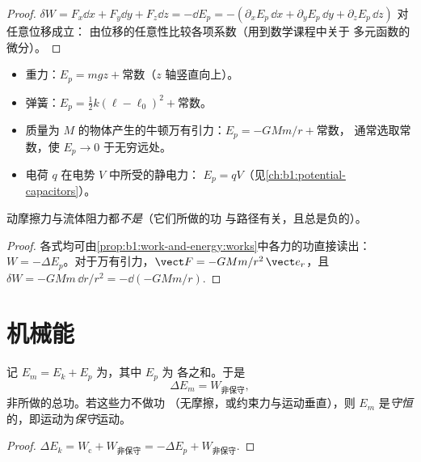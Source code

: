 \begin{proof}
$\delta W = F_x\dd x + F_y\dd y + F_z\dd z = -\dd E_p = -(\partial_xE_p\,\dd x
+ \partial_yE_p\,\dd y + \partial_zE_p\,\dd z)$ 对任意位移成立：
由位移的任意性比较各项系数（用到数学课程中关于
多元函数的微分）。
\end{proof}

\begin{proposition}[常见势能]\label{prop:b1:work-and-energy:eps}
\begin{itemize}
  \item 重力：$E_p = mgz + \text{常数}$（$z$ 轴竖直向上）。
  \item 弹簧：$E_p = \tfrac12 k(\ell - \ell_0)^2 + \text{常数}$。
  \item 质量为 $M$ 的物体产生的牛顿万有引力：$E_p = -GMm/r + \text{常数}$，
        通常选取常数，使 $E_p \to 0$ 于无穷远处。
  \item 电荷 $q$ 在电势 $V$ 中所受的静电力：
        $E_p = qV$（见\cref{ch:b1:potential-capacitors}）。
\end{itemize}
动摩擦力与流体阻力都\emph{不是}（它们所做的功
与路径有关，且总是负的）。
\end{proposition}

\begin{proof}
各式均可由\cref{prop:b1:work-and-energy:works}中各力的功直接读出：
$W = -\Delta E_p$。对于万有引力，$\vect F = -GMm/r^2\,\vect e_r$，且
$\delta W = -GMm\,\dd r/r^2 = -\dd(-GMm/r)$.
\end{proof}

\section{机械能}

\begin{theorem}[机械能]\label{thm:b1:work-and-energy:em}
记 $E_m = E_k + E_p$ 为\emph{}，其中 $E_p$ 为
各之和。于是
\[
\Delta E_m = W_{\text{非保守}} ,
\]
非所做的总功。若这些力不做功
（无摩擦，或约束力与运动垂直），则 $E_m$
是\emph{守恒}的，即运动为\emph{保守}运动。
\end{theorem}

\begin{proof}
$\Delta E_k = W_{\text{c}} + W_{\text{非保守}} = -\Delta E_p + W_{\text{非保守}}$.
\end{proof}

